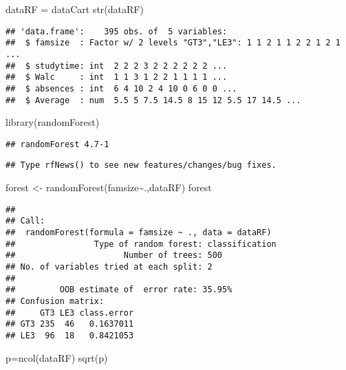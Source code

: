 \documentclass[
]{article}
\newenvironment{Shaded}{\begin{snugshade}}{\end{snugshade}}
\newcommand{\FunctionTok}[1]{\textcolor[rgb]{0.00,0.00,0.00}{#1}}
\newcommand{\NormalTok}[1]{#1}
\newcommand{\OtherTok}[1]{\textcolor[rgb]{0.56,0.35,0.01}{#1}}
\newcommand{\SpecialCharTok}[1]{\textcolor[rgb]{0.00,0.00,0.00}{#1}}
\begin{document}
\begin{Shaded}
\begin{Highlighting}[]
\NormalTok{dataRF }\OtherTok{=}\NormalTok{ dataCart}
\FunctionTok{str}\NormalTok{(dataRF)}
\end{Highlighting}
\end{Shaded}

\begin{verbatim}
## 'data.frame':    395 obs. of  5 variables:
##  $ famsize  : Factor w/ 2 levels "GT3","LE3": 1 1 2 1 1 2 2 1 2 1 ...
##  $ studytime: int  2 2 2 3 2 2 2 2 2 2 ...
##  $ Walc     : int  1 1 3 1 2 2 1 1 1 1 ...
##  $ absences : int  6 4 10 2 4 10 0 6 0 0 ...
##  $ Average  : num  5.5 5 7.5 14.5 8 15 12 5.5 17 14.5 ...
\end{verbatim}

\begin{Shaded}
\begin{Highlighting}[]
\FunctionTok{library}\NormalTok{(randomForest)}
\end{Highlighting}
\end{Shaded}

\begin{verbatim}
## randomForest 4.7-1
\end{verbatim}

\begin{verbatim}
## Type rfNews() to see new features/changes/bug fixes.
\end{verbatim}

\begin{Shaded}
\begin{Highlighting}[]
\NormalTok{forest }\OtherTok{\textless{}{-}} \FunctionTok{randomForest}\NormalTok{(famsize}\SpecialCharTok{\textasciitilde{}}\NormalTok{.,dataRF)}
\NormalTok{forest}
\end{Highlighting}
\end{Shaded}

\begin{verbatim}
## 
## Call:
##  randomForest(formula = famsize ~ ., data = dataRF) 
##                Type of random forest: classification
##                      Number of trees: 500
## No. of variables tried at each split: 2
## 
##         OOB estimate of  error rate: 35.95%
## Confusion matrix:
##     GT3 LE3 class.error
## GT3 235  46   0.1637011
## LE3  96  18   0.8421053
\end{verbatim}

\begin{Shaded}
\begin{Highlighting}[]
\NormalTok{p}\OtherTok{=}\FunctionTok{ncol}\NormalTok{(dataRF)}
\FunctionTok{sqrt}\NormalTok{(p)}
\end{Highlighting}
\end{Shaded}
\end{document}

